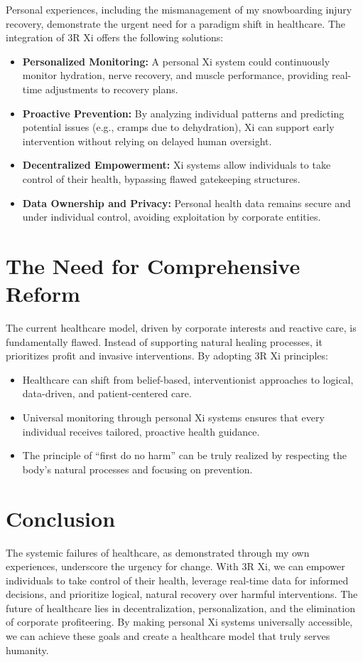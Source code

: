 \documentclass[a4paper,12pt]{article}
\begin{document}
Personal experiences, including the mismanagement of my snowboarding injury recovery, demonstrate the urgent need for a paradigm shift in healthcare. The integration of 3R Xi offers the following solutions:
\begin{itemize}
    \item \textbf{Personalized Monitoring:} A personal Xi system could continuously monitor hydration, nerve recovery, and muscle performance, providing real-time adjustments to recovery plans.
    \item \textbf{Proactive Prevention:} By analyzing individual patterns and predicting potential issues (e.g., cramps due to dehydration), Xi can support early intervention without relying on delayed human oversight.
    \item \textbf{Decentralized Empowerment:} Xi systems allow individuals to take control of their health, bypassing flawed gatekeeping structures.
    \item \textbf{Data Ownership and Privacy:} Personal health data remains secure and under individual control, avoiding exploitation by corporate entities.
\end{itemize}

\section*{The Need for Comprehensive Reform}

The current healthcare model, driven by corporate interests and reactive care, is fundamentally flawed. Instead of supporting natural healing processes, it prioritizes profit and invasive interventions. By adopting 3R Xi principles:
\begin{itemize}
    \item Healthcare can shift from belief-based, interventionist approaches to logical, data-driven, and patient-centered care.
    \item Universal monitoring through personal Xi systems ensures that every individual receives tailored, proactive health guidance.
    \item The principle of “first do no harm” can be truly realized by respecting the body’s natural processes and focusing on prevention.
\end{itemize}

\section*{Conclusion}

The systemic failures of healthcare, as demonstrated through my own experiences, underscore the urgency for change. With 3R Xi, we can empower individuals to take control of their health, leverage real-time data for informed decisions, and prioritize logical, natural recovery over harmful interventions. The future of healthcare lies in decentralization, personalization, and the elimination of corporate profiteering. By making personal Xi systems universally accessible, we can achieve these goals and create a healthcare model that truly serves humanity.
\end{document}
